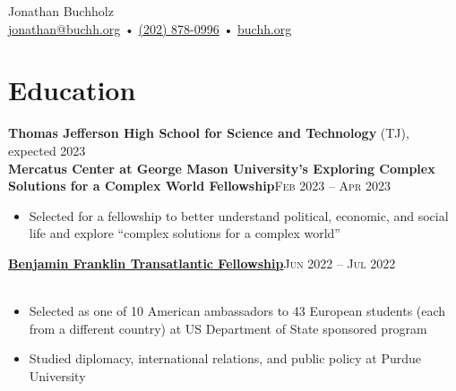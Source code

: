 \documentclass[12pt, a4paper]{article}
\begin{document}
{\LARGE Jonathan Buchholz}\\
\href{mailto:jonathan@buchh.org}{jonathan@buchh.org} • \href{tel:2028780996}{(202) 878-0996} • \href{https://buchh.org}{buchh.org}\\


\vspace{-12mm}
\section*{Education}
\vspace{-2mm}
\textbf{Thomas Jefferson High School for Science and Technology} (TJ), expected 2023\\





\vspace{-2mm}
\textbf{Mercatus Center at George Mason University’s Exploring Complex Solutions for a Complex World Fellowship}\hfill\textsc{Feb 2023 -- Apr 2023}\\
\begin{itemize}
    \vspace{-8mm}
    \item Selected for a fellowship to better understand political, economic, and social life and explore ``complex solutions for a complex world''
\end{itemize}

\textbf{\href{https://www.education.purdue.edu/ben-franklin-institute/}{Benjamin Franklin Transatlantic Fellowship}}\hfill\textsc{Jun 2022 -- Jul 2022}\\\
\begin{itemize}
    \vspace{-8mm}
    \item Selected as one of 10 American ambassadors to 43 European students (each from a different country) at US Department of State sponsored program
    \item Studied diplomacy, international relations, and public policy at Purdue University
\end{itemize}
\end{document}
